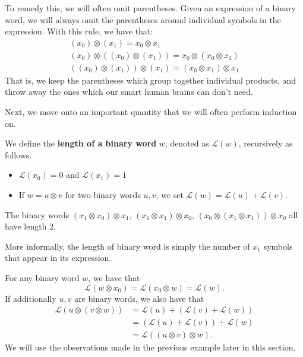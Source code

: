 To remedy this, we will often omit parentheses. Given an expression of 
a binary word, we will always omit the parentheses around individual symbols in the 
expression. With this rule, we have that:
\begin{gather*}
    (x_0)\otimes (x_1) = x_0 \otimes x_1\\
    (x_0)\otimes((x_0)\otimes(x_1))= x_0\otimes(x_0 \otimes x_1)\\
    ((x_0)\otimes(x_1))\otimes (x_1) = ( x_0\otimes x_1)\otimes x_1 
\end{gather*}
That is, we keep the parentheses which group together individual products, 
and throw away the ones which our smart human brains can don't need.



Next, we move onto an important quantity that we will often perform induction on.
\begin{definition}
    We define the \textbf{length of a binary word} $w$, denoted as $\mathcal{L}(w)$,
    recursively as follows. 
    \begin{itemize}
        \itemsep-0.25em
        \item $\mathcal{L}(x_0) = 0$ and $\mathcal{L}(x_1) = 1$
        \item If $w=  u \otimes v$ for two binary words $u, v$, we set $\mathcal{L}(w) = \mathcal{L}(u) + \mathcal{L}(v)$.
    \end{itemize}
\end{definition} 
\begin{example}
    The binary words 
    $(x_1\otimes x_0)\otimes x_1$, $(x_1\otimes x_1)\otimes x_0$, $(x_0 \otimes (x_1\otimes x_1))\otimes x_0$
    all have length $2$. 
\end{example}

More informally, the length of binary word is simply the number of $x_1$ symbols that 
appear in its expression.  

\begin{example}\label{example:binary_word_lengths}
    For any binary word $w$, we have that 
    \[
        \mathcal{L}(w \otimes x_0) = \mathcal{L}(x_0 \otimes w) =  \mathcal{L}(w).
    \]
    If additionally $u,v$ are binary words, we also have that 
    \begin{align*}
        \mathcal{L}(u \otimes(v \otimes  w)) 
        &= 
        \mathcal{L}(u) + \left(\mathcal{L}(v) + \mathcal{L}(w)\right)\\
        &=
        \left( \mathcal{L}(u) + \mathcal{L}(v) \right) + \mathcal{L}(w)\\
        &=
        \mathcal{L}((u \otimes v) \otimes  w).
    \end{align*}
    We will use the observations made in the previous example later in this section.
\end{example}

